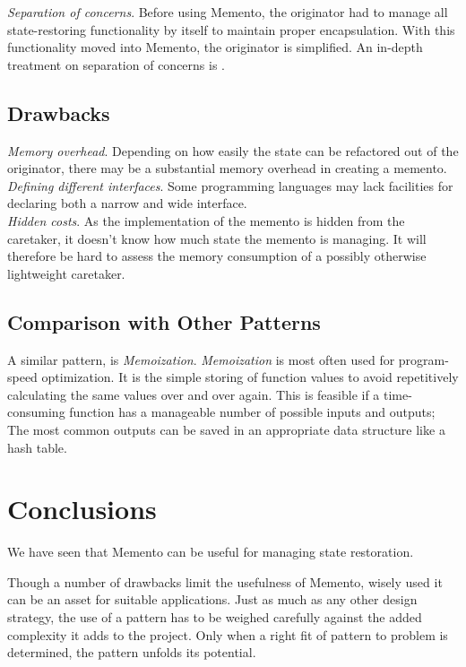 \documentclass[11pt, a4paper, twoside]{article}
\begin{document}
	\noindent\emph{Separation of concerns}. Before using Memento, the originator had to manage all state-restoring functionality by itself to maintain proper encapsulation. With this functionality moved into Memento, the originator is simplified. An in-depth treatment on separation of concerns is \cite{Huersch95}.
	
	\subsection{Drawbacks}
	\emph{Memory overhead}. Depending on how easily the state can be refactored out of the originator, there may be a substantial memory overhead in creating a memento. \\
	
	\noindent\emph{Defining different interfaces}. Some programming languages may lack facilities for declaring both a narrow and wide interface. \\
	
	\noindent\emph{Hidden costs}. As the implementation of the memento is hidden from the caretaker, it doesn't know how much state the memento is managing. It will therefore be hard to assess the memory consumption of a possibly otherwise lightweight caretaker.
	
	\subsection{Comparison with Other Patterns}
	A similar pattern, is \emph{Memoization}. \emph{Memoization} is most often used for program-speed optimization. It is the simple storing of function values to avoid repetitively calculating the same values over and over again. This is feasible if a time-consuming function has a manageable number of possible inputs and outputs; The most common outputs can be saved in an appropriate data structure like a hash table.
	
	\section{Conclusions}
	We have seen that Memento can be useful for managing state restoration.
	
	Though a number of drawbacks limit the usefulness of Memento, wisely used it can be an asset for suitable applications. Just as much as any other design strategy, the use of a pattern has to be weighed carefully against the added complexity it adds to the project. Only when a right fit of pattern to problem is determined, the pattern unfolds its potential.
	
	
	
\end{document}
